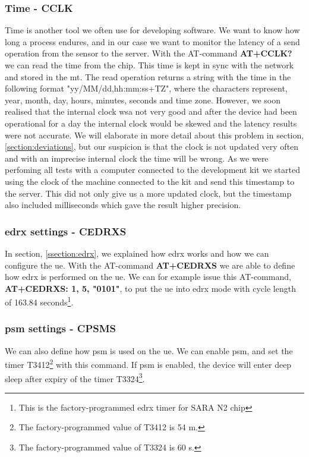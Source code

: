 \documentclass[USenglish]{ifimaster}  %
\begin{document}
\subsubsection{Time - CCLK} \label{ssection:timecclk}
Time is another tool we often use for developing software. We want to know how long a process endures, and in our case we want to monitor the latency of a send operation from the sensor to the server. With the AT-command \textbf{AT+CCLK?} we can read the time from the chip. This time is kept in sync with the network and stored in the \acrshort{mt}. The read operation returns a string with the time in the following format "yy/MM/dd,hh:mm:ss+TZ", where the characters represent, year, month, day, hours, minutes, seconds and time zone. However, we soon realised that the internal clock wsa not very good and after the device had been operational for a day the internal clock would be skewed and the latency results were not accurate. We will elaborate in more detail about this problem in section, \vref{section:deviations}, but our suspicion is that the clock is not updated very often and with an imprecise internal clock the time will be wrong. As we were perfoming all tests with a computer connected to the development kit we started using the clock of the machine connected to the kit and send this timestamp to the server. This did not only give us a more updated clock, but the timestamp also included milliseconds which gave the result higher precision.

\subsubsection{\acrshort{edrx} settings - CEDRXS}
In section, \vref{ssection:edrx}, we explained how \acrshort{edrx} works and how we can configure the \acrshort{ue}. With the AT-command \textbf{AT+CEDRXS} we are able to define how \acrshort{edrx} is performed on the \acrshort{ue}. We can for example issue this AT-command, \textbf{AT+CEDRXS: 1, 5, "0101"}, to put the \acrshort{ue} into \acrshort{edrx} mode with cycle length of 163.84 seconds\footnote{This is the factory-programmed \acrshort{edrx} timer for SARA N2 chip}.

\subsubsection{\acrshort{psm} settings - CPSMS}
We can also define how \acrshort{psm} is used on the \acrshort{ue}. We can enable \acrshort{psm}, and set the timer \acrfull{T3412}\footnote{The factory-programmed value of \acrshort{T3412} is 54 m.\cite{atcommand:ubloxchip}} with this command. If \acrshort{psm} is enabled, the device will enter deep sleep after expiry of the timer \acrfull{T3324}\footnote{The factory-programmed value of \acrshort{T3324} is 60 s.\cite{atcommand:ubloxchip}}.
\end{document}
